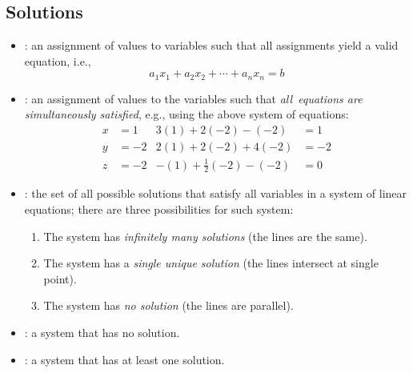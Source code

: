 \begin{itemize}
  \subsection{Solutions}\label{Solutions}
  \begin{itemize}
    \item {}: an assignment of values to variables such that all assignments yield a valid equation, i.e.,
    \[%
    a_1x_1+a_2x_2+\cdots+a_n x_n=b
    \]%
    \item {}: an assignment of values to the variables such that \emph{all~equations are simultaneously satisfied}, e.g., using the above system of equations:
    \begin{align*}
      x &= 1  & 3(1) + 2(-2) - (-2) &= 1 \\
      y &= -2 & 2(1) + 2(-2) + 4(-2)&= -2\\
      z &= -2 & -(1) + \tfrac{1}{2}(-2) - (-2) &= 0
    \end{align*}
    \item {}: the set of all possible solutions that satisfy all variables in a system of linear equations; there are three possibilities for such system: 
      \begin{enumerate}
        \item The system has \emph{infinitely many solutions} (the lines are the same).
        \item The system has a \emph{single unique solution} (the lines intersect at single point).
        \item The system has \emph{no solution} (the lines are parallel).
      \end{enumerate}
    \item {}: a system that has no solution.
    \item {}: a system that has at least one solution.
  \end{itemize}


\end{itemize}
